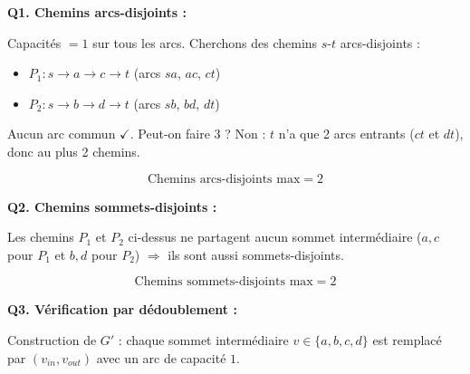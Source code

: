 \documentclass[12pt,a4paper]{article}
\begin{document}
\begin{correction}
\textbf{Q1. Chemins arcs-disjoints :}

Capacit\'es $= 1$ sur tous les arcs. Cherchons des chemins $s$-$t$ arcs-disjoints :
\begin{itemize}[nosep]
    \item $P_1 : s \to a \to c \to t$ \quad (arcs $sa$, $ac$, $ct$)
    \item $P_2 : s \to b \to d \to t$ \quad (arcs $sb$, $bd$, $dt$)
\end{itemize}

Aucun arc commun $\checkmark$. Peut-on faire 3 ? Non : $t$ n'a que 2 arcs entrants ($ct$ et $dt$), donc au plus 2 chemins.

$$\boxed{\text{Chemins arcs-disjoints max} = 2}$$

\medskip
\textbf{Q2. Chemins sommets-disjoints :}

Les chemins $P_1$ et $P_2$ ci-dessus ne partagent aucun sommet interm\'ediaire ($a, c$ pour $P_1$ et $b, d$ pour $P_2$) $\Rightarrow$ ils sont aussi sommets-disjoints.

$$\boxed{\text{Chemins sommets-disjoints max} = 2}$$

\medskip
\textbf{Q3. V\'erification par d\'edoublement :}

Construction de $G'$ : chaque sommet interm\'ediaire $v \in \{a, b, c, d\}$ est remplac\'e par $(v_{in}, v_{out})$ avec un arc de capacit\'e $1$.

\begin{center}
\end{center}
\end{correction}
\end{document}
